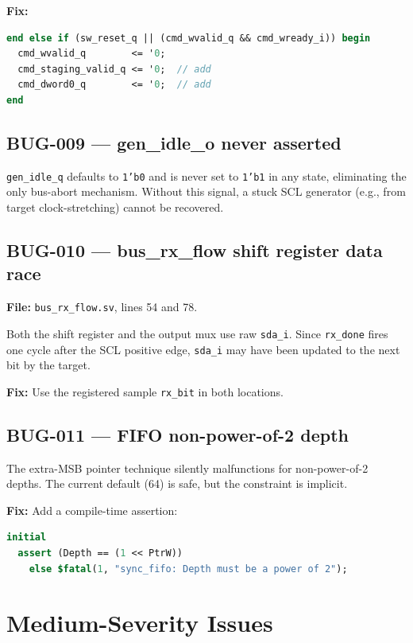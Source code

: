 \documentclass[12pt, a4paper, oneside]{report}
\newcommand{\signal}[1]{\texttt{#1}}
\newcommand{\file}[1]{\texttt{#1}}
\begin{document}
\textbf{Fix:}
\begin{lstlisting}[language=SystemVerilog]
end else if (sw_reset_q || (cmd_wvalid_q && cmd_wready_i)) begin
  cmd_wvalid_q        <= '0;
  cmd_staging_valid_q <= '0;  // add
  cmd_dword0_q        <= '0;  // add
end
\end{lstlisting}

\subsection*{BUG-009 --- gen\_idle\_o never asserted}

\signal{gen\_idle\_q} defaults to \signal{1'b0} and is never set to \signal{1'b1}
in any state, eliminating the only bus-abort mechanism. Without this signal, a
stuck SCL generator (e.g., from target clock-stretching) cannot be recovered.

\subsection*{BUG-010 --- bus\_rx\_flow shift register data race}

\textbf{File:} \file{bus\_rx\_flow.sv}, lines 54 and 78.

Both the shift register and the output mux use raw \signal{sda\_i}. Since
\signal{rx\_done} fires one cycle after the SCL positive edge, \signal{sda\_i}
may have been updated to the next bit by the target.

\textbf{Fix:} Use the registered sample \signal{rx\_bit} in both locations.

\subsection*{BUG-011 --- FIFO non-power-of-2 depth}

The extra-MSB pointer technique silently malfunctions for non-power-of-2 depths.
The current default (64) is safe, but the constraint is implicit.

\textbf{Fix:} Add a compile-time assertion:
\begin{lstlisting}[language=SystemVerilog]
initial
  assert (Depth == (1 << PtrW))
    else $fatal(1, "sync_fifo: Depth must be a power of 2");
\end{lstlisting}

\section{Medium-Severity Issues}
\end{document}
